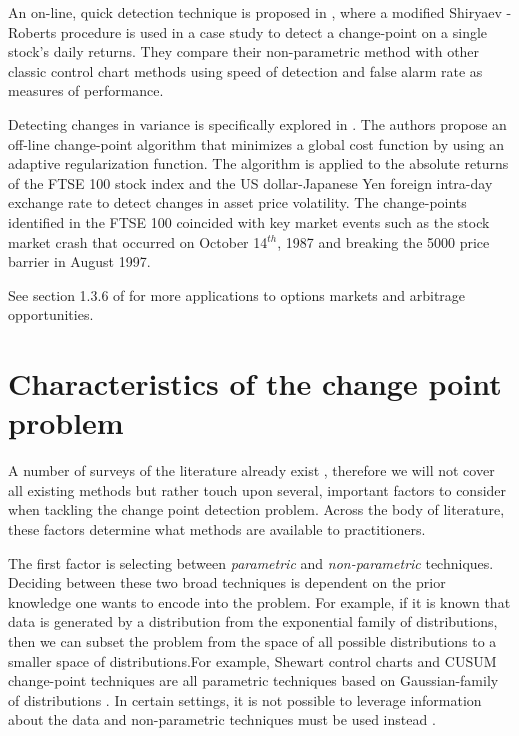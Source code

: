An on-line, quick detection technique is proposed in  \cite{pepelyshev2015real}, where a modified Shiryaev - Roberts procedure is used in a case study to detect a change-point on a single stock's daily returns. They compare their non-parametric method with other classic control chart methods using speed of detection and false alarm rate as measures of performance.

Detecting changes in variance is specifically explored in  \cite{lavielle2007adaptive}. The authors propose an off-line change-point algorithm that minimizes a global cost function by using an adaptive regularization function. The algorithm is applied to the absolute returns of the FTSE 100 stock index and the US dollar-Japanese Yen foreign intra-day exchange rate to detect changes in asset price volatility. The change-points  identified in the FTSE 100 coincided with key market events such as the stock market crash that occurred on October 14$^{th}$, 1987 and breaking the 5000 price barrier in August 1997.

See section 1.3.6 of \cite{tartakovsky2014sequential} for more applications to options markets and arbitrage opportunities.

\section{Characteristics of the change point problem}
A number of surveys of the literature already exist \cite{aminikhanghahi2017survey} \cite{niu2016multiple}, therefore we will not cover all existing methods but rather touch upon several, important factors to consider when tackling the change point detection problem. Across the body of literature, these factors determine what methods are available to practitioners. %

The first factor is selecting between \textit{parametric} and \textit{non-parametric} techniques. Deciding between these two broad techniques is dependent on the prior knowledge one wants to encode into the problem. For example, if it is known that data is generated by a distribution from the exponential family of distributions, then we can subset the problem from the space of all possible distributions to a smaller space of distributions.For example, Shewart control charts and CUSUM change-point techniques are all parametric techniques based on Gaussian-family of distributions \cite{page1954continuous} \cite{chen2011parametric}. In certain settings, it is not possible to leverage information about the data and non-parametric techniques must be used instead \cite{brodsky2013nonparametric}.

